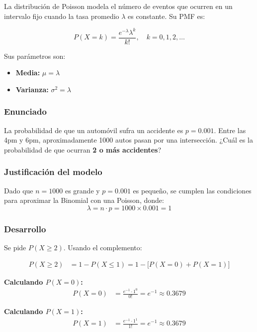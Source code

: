 \documentclass[12pt,a4paper]{article}
\begin{document}
La distribución de Poisson modela el número de eventos que ocurren en un intervalo
fijo cuando la tasa promedio $\lambda$ es constante. Su PMF es:
 
\begin{equation}
    P(X = k) = \frac{e^{-\lambda} \lambda^k}{k!}, \quad k = 0, 1, 2, \dots
\end{equation}
 
Sus parámetros son:
\begin{itemize}
    \item \textbf{Media:} $\mu = \lambda$
    \item \textbf{Varianza:} $\sigma^2 = \lambda$
\end{itemize}
 
\subsubsection*{Enunciado}
 
La probabilidad de que un automóvil sufra un accidente es $p = 0.001$. Entre las 4pm
y 6pm, aproximadamente 1000 autos pasan por una intersección. ¿Cuál es la
probabilidad de que ocurran \textbf{2 o más accidentes}?
 
\subsubsection*{Justificación del modelo}
 
Dado que $n = 1000$ es grande y $p = 0.001$ es pequeño, se cumplen las condiciones
para aproximar la Binomial con una Poisson, donde:
\[
    \lambda = n \cdot p = 1000 \times 0.001 = 1
\]
 
\subsubsection*{Desarrollo}
 
Se pide $P(X \geq 2)$. Usando el complemento:
 
\begin{align}
    P(X \geq 2) &= 1 - P(X \leq 1) = 1 - \bigl[P(X=0) + P(X=1)\bigr]
\end{align}
 
\textbf{Calculando $P(X = 0)$:}
\begin{align}
    P(X = 0) &= \frac{e^{-1} \cdot 1^0}{0!} = e^{-1} \approx 0.3679
\end{align}
 
\textbf{Calculando $P(X = 1)$:}
\begin{align}
    P(X = 1) &= \frac{e^{-1} \cdot 1^1}{1!} = e^{-1} \approx 0.3679
\end{align}
 
\end{document}
